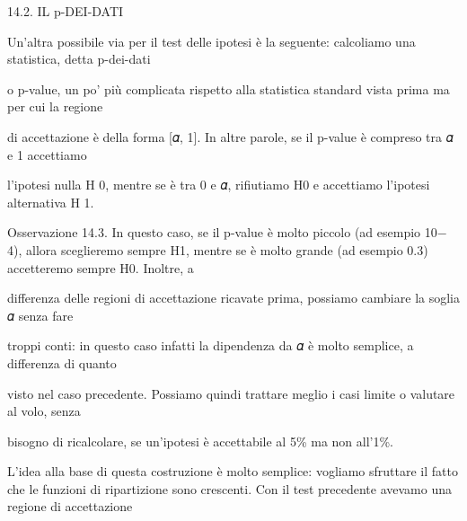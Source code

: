 \documentclass[a4paper,portrait,12pt]{article}
\begin{document}
\begin{flushleft}
14.2. IL p-DEI-DATI
\end{flushleft}


\begin{flushleft}
Un'altra possibile via per il test delle ipotesi \`{e} la seguente: calcoliamo una statistica, detta p-dei-dati
\end{flushleft}


\begin{flushleft}
o p-value, un po' più complicata rispetto alla statistica standard vista prima ma per cui la regione
\end{flushleft}


\begin{flushleft}
di accettazione \`{e} della forma [𝛼, 1]. In altre parole, se il p-value \`{e} compreso tra 𝛼 e 1 accettiamo
\end{flushleft}


\begin{flushleft}
l'ipotesi nulla H 0, mentre se \`{e} tra 0 e 𝛼, rifiutiamo H0 e accettiamo l'ipotesi alternativa H 1.
\end{flushleft}


\begin{flushleft}
Osservazione 14.3. In questo caso, se il p-value \`{e} molto piccolo (ad esempio 10$-$4), allora sceglieremo sempre H1, mentre se \`{e} molto grande (ad esempio 0.3) accetteremo sempre H0. Inoltre, a
\end{flushleft}


\begin{flushleft}
differenza delle regioni di accettazione ricavate prima, possiamo cambiare la soglia 𝛼 senza fare
\end{flushleft}


\begin{flushleft}
troppi conti: in questo caso infatti la dipendenza da 𝛼 \`{e} molto semplice, a differenza di quanto
\end{flushleft}


\begin{flushleft}
visto nel caso precedente. Possiamo quindi trattare meglio i casi limite o valutare al volo, senza
\end{flushleft}


\begin{flushleft}
bisogno di ricalcolare, se un'ipotesi \`{e} accettabile al 5\% ma non all'1\%.
\end{flushleft}


\begin{flushleft}
L'idea alla base di questa costruzione \`{e} molto semplice: vogliamo sfruttare il fatto che le funzioni di ripartizione sono crescenti. Con il test precedente avevamo una regione di accettazione
\end{flushleft}
\end{document}
